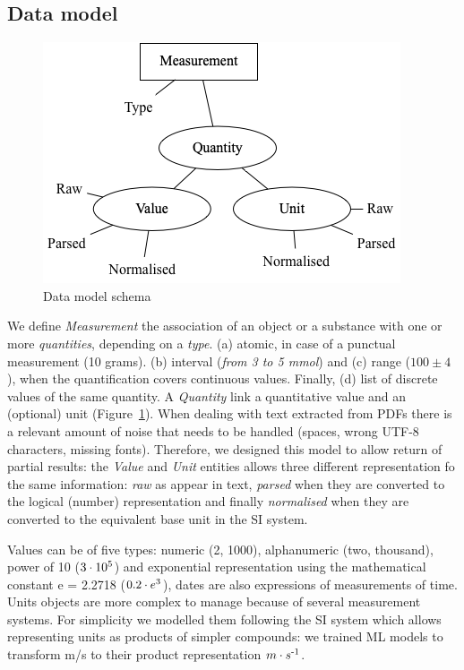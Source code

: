 \documentclass[sigconf]{acmart}
\begin{document}
\subsection{Data model}
\label{subsub:data-model}
\begin{figure}[ht]
  \centering
  \includegraphics[width=\linewidth]{images/schema-2}
  \caption{Data model schema}
  \label{fig:data-model-schema-2}
\end{figure}
We define \textit{Measurement} the association of an object or a substance with one or more \textit{quantities}, depending on a \textit{type}. (a) atomic, in case of a punctual measurement (10 grams). (b) interval (\textit{from 3 to 5 mmol}) and (c) range ($100 \pm 4$), when the quantification covers continuous values. Finally, (d) list of discrete values of the same quantity. A \textit{Quantity} link a  quantitative value and an (optional) unit (Figure~\ref{fig:data-model-schema-2}). 
When dealing with text extracted from PDFs there is a relevant amount of noise that needs to be handled (spaces, wrong UTF-8 characters, missing fonts). Therefore, we designed this model to allow return of partial results: the \textit{Value} and \textit{Unit} entities allows three different representation fo the same information: \textit{raw} as appear in text, \textit{parsed} when they are converted to the logical (number) representation and finally \textit{normalised} when they are converted to the equivalent base unit in the SI system. 

Values can be of five types: numeric (2, 1000), alphanumeric (two, thousand), power of 10 ($3\cdot10\textsuperscript{5}$) and exponential representation using the mathematical constant e = 2.2718 ($0.2\cdot e\textsuperscript{3}$), dates are also expressions of measurements of time. Units objects are more complex to manage because of several measurement systems. For simplicity we modelled them following the SI system which allows representing units as products of simpler compounds: we trained ML models to transform m/s to their product representation $m \cdot s\textsuperscript{-1}$.
\end{document}
